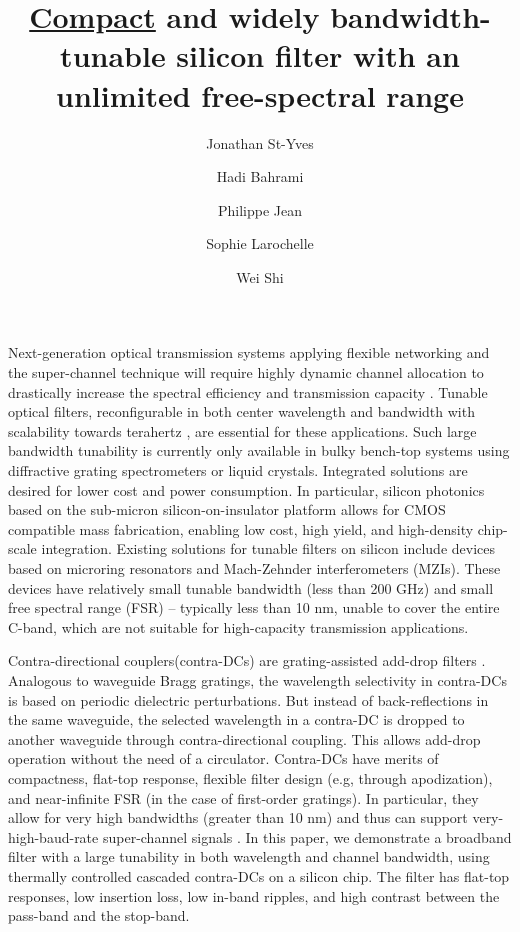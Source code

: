 \documentclass[9pt,twocolumn,twoside]{osajnl}
\title{\underline{Compact} and widely bandwidth-tunable silicon filter with an unlimited free-spectral range}
\author[1]{Jonathan St-Yves}
\author[1]{Hadi Bahrami}
\author[1]{Philippe Jean}
\author[1]{Sophie Larochelle}
\author[1,*]{Wei Shi}
\affil[1]{Centre d'optique, photonique et laser (COPL) and Département de génie électrique et génie informatique, Université Laval, 2375 rue de la Terrasse, Québec (Québec), Canada, G1V 0A6}
\affil[*]{Corresponding author: wei.shi@gel.ulaval.ca}
\begin{document}
	\maketitle
	\thispagestyle{fancy}
	
	
	Next-generation optical transmission systems applying flexible networking and the super-channel technique will require highly dynamic channel allocation to drastically increase the spectral efficiency and transmission capacity \cite{jinno2009spectrum, geisler2011demonstration}.
	Tunable optical filters, reconfigurable in both center wavelength and bandwidth with scalability towards terahertz \cite{geisler2011demonstration}, are essential for these applications.
	Such large bandwidth tunability is currently only available in bulky bench-top systems using diffractive grating spectrometers or liquid crystals.
	Integrated solutions are desired for lower cost and power consumption.
	In particular, silicon photonics  based on the sub-micron silicon-on-insulator platform allows for CMOS compatible mass fabrication, enabling low cost, high yield, and high-density chip-scale integration.
	Existing solutions for tunable  filters on silicon include devices based on microring resonators \cite{DynamicBW, ong2013ultra} and Mach-Zehnder interferometers (MZIs). These devices have relatively small tunable bandwidth (less than 200 GHz) and small free spectral range (FSR) -- typically less than 10 nm, unable to cover the entire C-band, which are not suitable for high-capacity transmission applications.
	
	Contra-directional couplers(contra-DCs) are grating-assisted add-drop filters \cite{shi2013siliconContraDC}. 
	Analogous to waveguide Bragg gratings, the wavelength selectivity in contra-DCs is based on periodic dielectric perturbations. But instead of back-reflections in the same waveguide, the selected wavelength in a contra-DC is dropped to another waveguide through contra-directional coupling.
	This allows add-drop operation without the need of a circulator. 
	Contra-DCs have merits of compactness, flat-top response, flexible filter design (e.g, through apodization), and near-infinite FSR (in the case of first-order gratings).
	In particular, they allow for very high bandwidths (greater than 10 nm) and thus can support very-high-baud-rate super-channel signals \cite{jinno2009spectrum}.
	In this paper, we demonstrate a broadband filter with a large tunability in both wavelength and channel bandwidth, using thermally controlled cascaded contra-DCs on a silicon chip. 
	The filter has flat-top responses, low insertion loss, low in-band ripples, and high contrast between the pass-band and the stop-band.
	
\end{document}
